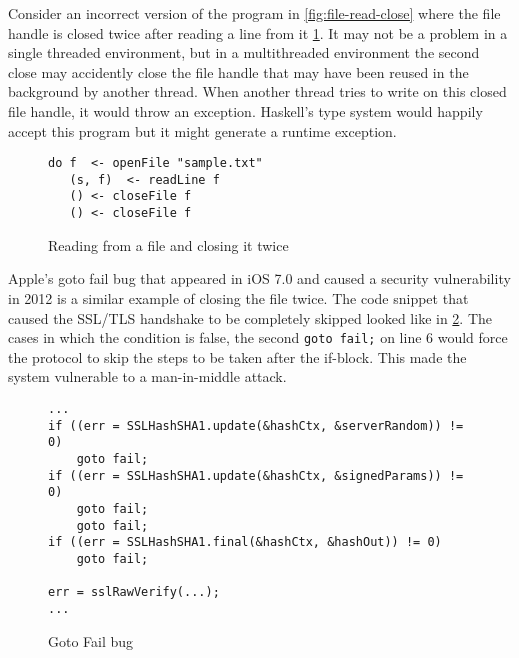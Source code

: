 Consider an incorrect version of the program in \cref{fig:file-read-close}
where the file handle is closed twice after reading a line from it \cref{fig:file-read-close-2times}.
It may not be a problem in a single threaded environment, but in a multithreaded environment
the second close may accidently close the file handle that may have been reused in the background by another thread.
When another thread tries to write on this closed file handle, it would throw an exception.
Haskell's type system would happily accept this program but it might generate a runtime exception.
\begin{figure}[h]
  \begin{framed}
    \begin{verbatim}
do f  <- openFile "sample.txt"
   (s, f)  <- readLine f
   () <- closeFile f
   () <- closeFile f
    \end{verbatim}
  \end{framed}
  \caption{Reading from a file and closing it twice}
  \label{fig:file-read-close-2times}
\end{figure}

Apple's goto fail bug that appeared in iOS 7.0 and caused a security vulnerability in 2012 is a similar example of closing the file twice.
The code snippet that caused the SSL/TLS handshake to be completely skipped looked like in \cref{fig:goto-fail}.
The cases in which the condition is false, the second \texttt{goto fail;} on line 6 would force the protocol to skip the
steps to be taken after the if-block. This made the system vulnerable to a man-in-middle attack.
\begin{figure}[h]
  \begin{framed}
\begin{verbatim}
...
if ((err = SSLHashSHA1.update(&hashCtx, &serverRandom)) != 0)
    goto fail;
if ((err = SSLHashSHA1.update(&hashCtx, &signedParams)) != 0)
    goto fail;
    goto fail;
if ((err = SSLHashSHA1.final(&hashCtx, &hashOut)) != 0)
    goto fail;

err = sslRawVerify(...);
...
\end{verbatim}
  \end{framed}
  \caption{Goto Fail bug}
  \label{fig:goto-fail}
\end{figure}

